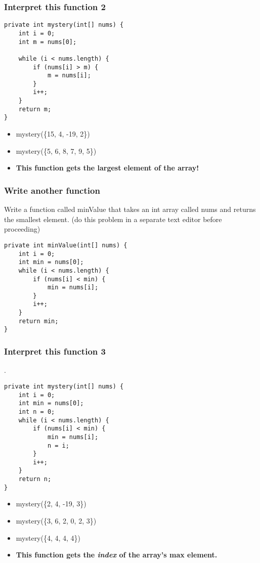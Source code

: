 \documentclass{beamer}
\begin{document}
\begin{frame}[fragile]
\frametitle{Interpret this function 2}
\begin{lstlisting}
private int mystery(int[] nums) {
    int i = 0;
    int m = nums[0];
    
    while (i < nums.length) {
        if (nums[i] > m) {
            m = nums[i];
        }
        i++;
    }
    return m;
}
\end{lstlisting}
\begin{itemize}
\item<2-> mystery(\{15, 4, -19, 2\})
\item<3-> mystery(\{5, 6, 8, 7, 9, 5\})
\item<4-> \textbf{This function gets the largest element of the array!}
\end{itemize}
\end{frame}

\begin{frame}[fragile]
\frametitle{Write another function}
Write a function called minValue that takes an int array called nums and returns the smallest element.
\pause
(do this problem in a separate text editor before proceeding)
\pause
\begin{lstlisting}
private int minValue(int[] nums) {
    int i = 0;
    int min = nums[0];
    while (i < nums.length) {
        if (nums[i] < min) {
            min = nums[i];
        }
        i++;
    }
    return min;
}
\end{lstlisting}
\end{frame}

\begin{frame}[fragile]
\frametitle{Interpret this function 3}
.
\begin{lstlisting}
private int mystery(int[] nums) {
    int i = 0;
    int min = nums[0];
    int n = 0;
    while (i < nums.length) {
        if (nums[i] < min) {
            min = nums[i];
            n = i;
        }
        i++;
    }
    return n;
}
\end{lstlisting}
\begin{itemize}
\item<2-> mystery(\{2, 4, -19, 3\})
\item<3-> mystery(\{3, 6, 2, 0, 2, 3\})
\item<4-> mystery(\{4, 4, 4, 4\})
\item<5-> \textbf{This function gets the \textit{index} of the array's max element.}
\end{itemize}
\end{frame}
\end{document}

